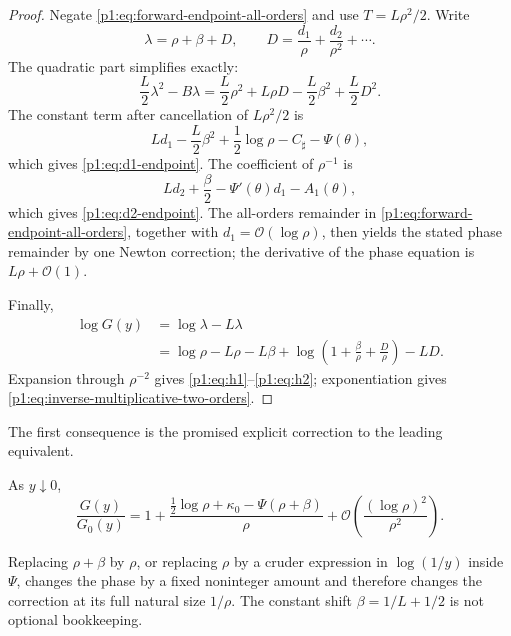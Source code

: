 \documentclass[11pt,oneside]{article}
\numberwithin{equation}{section}
\theoremstyle{definition}
\theoremstyle{remark}
\newcommand{\bigO}{\mathcal O}
\begin{document}
\begin{proof}
Negate \eqref{p1:eq:forward-endpoint-all-orders} and use
$T=L\rho^2/2$.  Write
\begin{equation}
 \lambda=\rho+\beta+D,
 \qquad
 D=\frac{d_1}{\rho}+\frac{d_2}{\rho^2}+\cdots.
 \label{p1:eq:lambda-D}
\end{equation}
The quadratic part simplifies exactly:
\begin{equation}
 \frac L2\lambda^2-B\lambda
 =\frac L2\rho^2+L\rho D-\frac L2\beta^2+\frac L2D^2.
 \label{p1:eq:quadratic-cancellation}
\end{equation}
The constant term after cancellation of $L\rho^2/2$ is
\[
 Ld_1-\frac L2\beta^2+\frac12\log\rho-C_{\sharp}-\Psi(\theta),
\]
which gives \eqref{p1:eq:d1-endpoint}.  The coefficient of $\rho^{-1}$ is
\[
 Ld_2+\frac\beta2-\Psi'(\theta)d_1-A_1(\theta),
\]
which gives \eqref{p1:eq:d2-endpoint}.  The all-orders remainder in
\eqref{p1:eq:forward-endpoint-all-orders}, together with $d_1=\bigO(\log\rho)$,
then yields the stated phase remainder by one Newton correction; the derivative of the
phase equation is $L\rho+\bigO(1)$.

Finally,
\begin{align*}
 \log G(y)
 &=\log\lambda-L\lambda\\
 &=\log\rho-L\rho-L\beta
   +\log\!\left(1+\frac\beta\rho+\frac D\rho\right)-LD.
\end{align*}
Expansion through $\rho^{-2}$ gives \eqref{p1:eq:h1}--\eqref{p1:eq:h2}; exponentiation
gives \eqref{p1:eq:inverse-multiplicative-two-orders}.
\end{proof}

The first consequence is the promised explicit correction to the leading equivalent.

\begin{corollary}
\label{p1:cor:first-oscillatory-inverse}
As $y\downarrow0$,
\begin{equation}
 \boxed{
 \frac{G(y)}{G_0(y)}
 =1+\frac{\tfrac12\log\rho+\kappa_0-\Psi(\rho+\beta)}{\rho}
 +\bigO\!\left(\frac{(\log\rho)^2}{\rho^2}\right).}
 \label{p1:eq:first-oscillatory-inverse}
\end{equation}
\end{corollary}

\begin{remark}
Replacing $\rho+\beta$ by $\rho$, or replacing $\rho$ by a cruder expression in
$\log(1/y)$ inside $\Psi$, changes the phase by a fixed noninteger amount and therefore
changes the correction at its full natural size $1/\rho$.  The constant shift
$\beta=1/L+1/2$ is not optional bookkeeping.
\end{remark}
\end{document}
